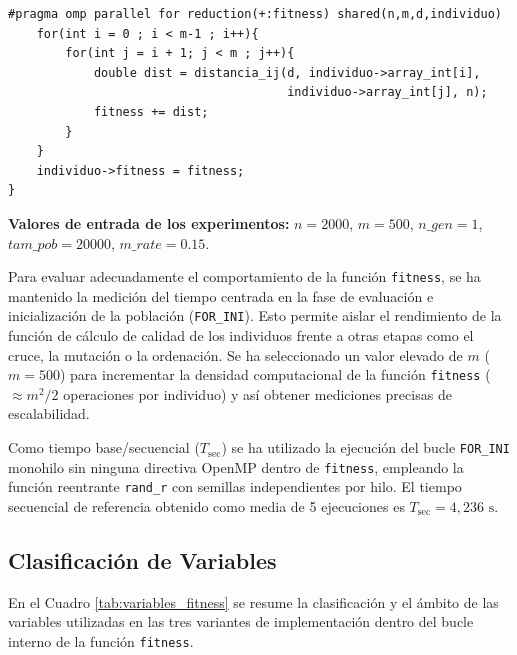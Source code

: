 \documentclass[12pt]{article}
\begin{document}
\begin{enumerate}
\begin{lstlisting}[style=EstiloC]
    #pragma omp parallel for reduction(+:fitness) shared(n,m,d,individuo)
    for(int i = 0 ; i < m-1 ; i++){
        for(int j = i + 1; j < m ; j++){
            double dist = distancia_ij(d, individuo->array_int[i],
                                       individuo->array_int[j], n);
            fitness += dist;
        }
    }
    individuo->fitness = fitness;
}
\end{lstlisting}


\textbf{Valores de entrada de los experimentos:} $n = 2000$, $m = 500$, $n\_gen = 1$, $tam\_pob = 20000$, $m\_rate = 0.15$.

Para evaluar adecuadamente el comportamiento de la función \texttt{fitness}, se ha mantenido la medición del tiempo centrada en la fase de evaluación e inicialización de la población (\texttt{FOR\_INI}). Esto permite aislar el rendimiento de la función de cálculo de calidad de los individuos frente a otras etapas como el cruce, la mutación o la ordenación. Se ha seleccionado un valor elevado de $m$ ($m=500$) para incrementar la densidad computacional de la función \texttt{fitness} ($\approx m^2/2$ operaciones por individuo) y así obtener mediciones precisas de escalabilidad.

Como tiempo base/secuencial ($T_{\text{sec}}$) se ha utilizado la ejecución del bucle \texttt{FOR\_INI} monohilo sin ninguna directiva OpenMP dentro de \texttt{fitness}, empleando la función reentrante \texttt{rand\_r} con semillas independientes por hilo. El tiempo secuencial de referencia obtenido como media de 5 ejecuciones es $T_{\text{sec}} = 4,236\text{ s}$.

\subsection*{Clasificación de Variables}

En el Cuadro \ref{tab:variables_fitness} se resume la clasificación y el ámbito de las variables utilizadas en las tres variantes de implementación dentro del bucle interno de la función \texttt{fitness}.


\end{enumerate}
\end{document}
